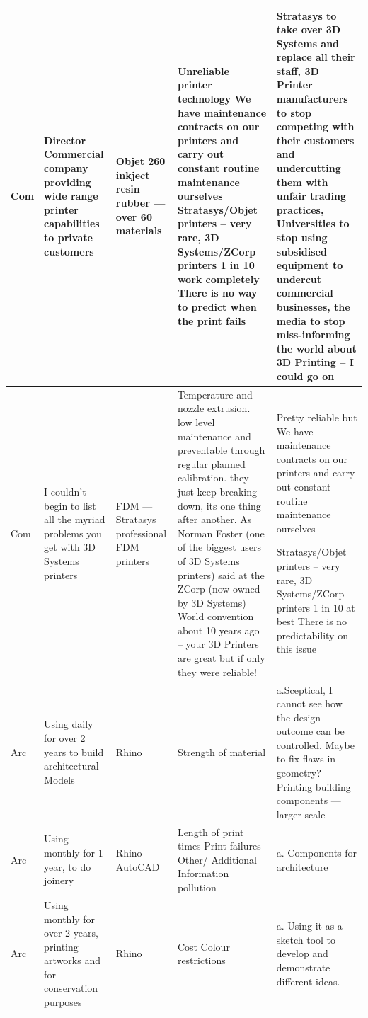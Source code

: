 \documentclass[11pt]{report} %
\begin{document}
\begin{longtable}{| p{1cm} | p{2.5cm} | p{2cm} | p{4cm} | p{4cm} |}
Com & Director Commercial company providing wide range printer capabilities to private customers 
 & Objet 260
inkject 
resin 
rubber --- over 60 materials & Unreliable printer technology
We have maintenance contracts on our printers and carry out constant routine maintenance ourselves
Stratasys/Objet printers – very rare, 3D Systems/ZCorp printers 1 in 10 work completely There is no way to predict when the print fails  & Stratasys to take over 3D Systems and replace all their staff, 3D Printer manufacturers to stop competing with their customers and undercutting them with unfair trading practices, Universities to stop using subsidised equipment to undercut commercial businesses, the media to stop miss-informing the world about 3D Printing – I could go on  \\\hline

Com & I couldn’t begin to list all the myriad problems you get with 3D Systems printers & FDM --- Stratasys professional FDM printers  & Temperature and nozzle extrusion. low level maintenance and preventable through regular planned calibration.  they just keep breaking down, its one thing after another. As Norman Foster (one of the biggest users of 3D Systems printers) said at the ZCorp (now owned by 3D Systems) World convention about 10 years ago – your 3D Printers are great but if only they were reliable! & Pretty reliable but We have maintenance contracts on our printers and carry out constant routine maintenance ourselves

 Stratasys/Objet printers – very rare, 3D Systems/ZCorp printers 1 in 10 at best There is no predictability on this issue \\\hline

Arc & Using daily for over 2 years to build architectural Models & Rhino & Strength of material & a.Sceptical, I cannot see how the design outcome can be controlled. Maybe to fix flaws in geometry?
Printing building components --- larger scale \\\hline

Arc & Using monthly for 1 year, to do joinery & Rhino AutoCAD & Length of print times
Print failures
Other/ Additional Information pollution & a. Components for architecture \\\hline

Arc &  Using monthly  for over 2 years, printing artworks and for conservation purposes & Rhino & Cost Colour restrictions & a. Using it as a sketch tool to develop and demonstrate different ideas. \\\hline


\end{longtable}
\end{document}
